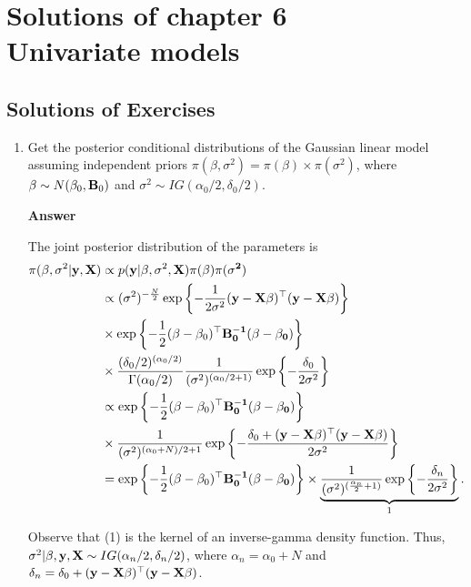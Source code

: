 \chapter{Solutions of chapter 6\\
Univariate models}\label{chap6}

\section{Solutions of Exercises}\label{sec61}
\begin{enumerate}[leftmargin=*]

	\item Get the posterior conditional distributions of the Gaussian linear model assuming independent priors $\pi(\beta,\sigma^2)=\pi(\beta)\times\pi(\sigma^2)$, where $\beta \sim N(\beta_0, {\bf{B}}_0)$ and $\sigma^2 \sim IG(\alpha_0/2, \delta_0/2)$.
	
\textbf{Answer}
	
The joint posterior distribution of the parameters is
\begin{align*}
	\pi(\beta, \sigma^2|\bf{y}, \bf{X}) & \propto p({\bf{y}}|\beta, \sigma^2, \bf{X}) \pi(\beta) \pi(\sigma^2) \\
	&\propto (\sigma^2)^{-\frac{N}{2}}\exp\left\{-\frac{1}{2\sigma^2}(\bf{y}-\bf{X}\beta)^{\top}(\bf{y}-\bf{X}\beta)\right\}\\
	&\times \exp\left\{-\frac{1}{2}(\beta - \beta _0)^{\top}\bf{B}_0^{-1}(\beta - \beta _0)\right\}\\
	&\times\frac{(\delta_0/2)^{(\alpha_0/2)}}{\Gamma(\alpha_0/2)}\frac{1}{(\sigma^2)^{(\alpha_0/2+1)}}\exp\left\{-\frac{\delta_0}{2\sigma^2}\right\}\\
	&\propto\exp\left\{-\frac{1}{2}(\beta - \beta _0)^{\top}\bf{B}_0^{-1}(\beta - \beta _0)\right\}\\
	&\times\frac{1}{(\sigma^2)^{(\alpha_0+N)/2+1}} \exp\left\{-\frac{\delta_0+(\bf{y}-\bf{X}\beta)^{\top}(\bf{y}-\bf{X}\beta)}{2\sigma^2}\right\}\\
	&=\exp\left\{-\frac{1}{2}(\beta - \beta _0)^{\top}\bf{B}_0^{-1}(\beta - \beta _0)\right\}\times\underbrace{\frac{1}{(\sigma^2)^{(\frac{\alpha_n}{2}+1)}} \exp\left\{-\frac{\delta_n}{2\sigma^2}\right\}}_1.
\end{align*}

Observe that (1) is the kernel of an inverse-gamma density function. Thus, $\sigma^2|\beta,{\bf{y}},{\bf{X}} \sim IG(\alpha_n/2,\delta_n/2)$, where $\alpha_n=\alpha_0+N$ and $\delta_n=\delta_0+(\bf{y}-\bf{X}\beta)^{\top}(\bf{y}-\bf{X}\beta)$.


\end{enumerate}
